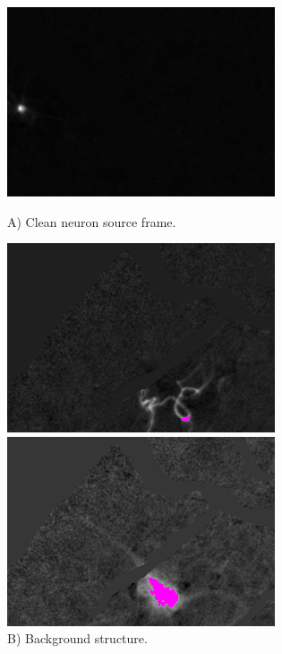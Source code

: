 \documentclass[10pt]{article}
\begin{document}
\begin{figure}[h]
    \centering
    \begin{minipage}{.33\textwidth}
      \centering
      \includegraphics[width=.9\linewidth]{figs/frame_2.png}
      \caption*{\footnotesize A) Clean neuron source frame.}
      \label{fig:frame1}
    \end{minipage}%
    \begin{minipage}{.33\textwidth}
      \centering
      \includegraphics[width=.9\linewidth]{figs/frame_3.png}
      \caption*{\footnotesize B) Background structure. }
      \label{fig:frame2}
    \end{minipage}
    \begin{minipage}{.33\textwidth}
      \centering
      \includegraphics[width=.9\linewidth]{figs/frame_4.png}

\end{minipage}
\end{figure}
\end{document}

